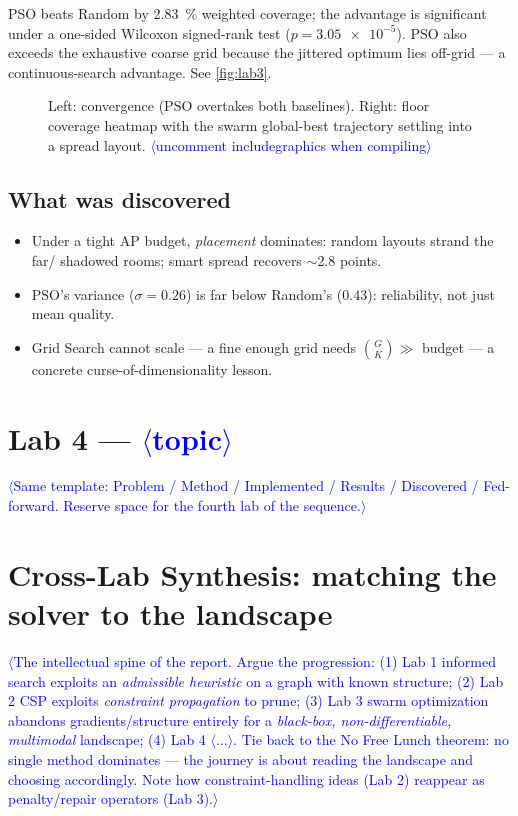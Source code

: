 \documentclass[11pt]{article}
\newcommand{\PH}[1]{\textcolor{blue}{$\langle$#1$\rangle$}}   %
\begin{document}
PSO beats Random by \SI{2.83}{\percent} weighted coverage; the advantage is
significant under a one-sided Wilcoxon signed-rank test ($p=\num{3.05e-5}$). PSO
also exceeds the exhaustive coarse grid because the jittered optimum lies
off-grid — a continuous-search advantage. See \autoref{fig:lab3}.

\begin{figure}[h]\centering
\caption{Left: convergence (PSO overtakes both baselines). Right: floor coverage
heatmap with the swarm global-best trajectory settling into a spread layout.
\PH{uncomment includegraphics when compiling}}
\label{fig:lab3}
\end{figure}

\subsection{What was discovered}
\begin{itemize}
  \item Under a tight AP budget, \emph{placement} dominates: random layouts
        strand the far/ shadowed rooms; smart spread recovers $\sim$2.8 points.
  \item PSO's variance ($\sigma=0.26$) is far below Random's ($0.43$):
        reliability, not just mean quality.
  \item Grid Search cannot scale — a fine enough grid needs
        $\binom{G}{K}\!\gg\!$ budget — a concrete curse-of-dimensionality lesson.
\end{itemize}

\section{Lab 4 --- \PH{topic}}
\label{sec:lab4}
\PH{Same template: Problem / Method / Implemented / Results / Discovered /
Fed-forward. Reserve space for the fourth lab of the sequence.}

\section{Cross-Lab Synthesis: matching the solver to the landscape}
\label{sec:synthesis}
\PH{The intellectual spine of the report. Argue the progression:
(1) Lab 1 informed search exploits an \emph{admissible heuristic} on a graph with
known structure; (2) Lab 2 CSP exploits \emph{constraint propagation} to prune;
(3) Lab 3 swarm optimization abandons gradients/structure entirely for a
\emph{black-box, non-differentiable, multimodal} landscape; (4) Lab 4 \PH{...}.
Tie back to the No Free Lunch theorem: no single method dominates — the journey
is about reading the landscape and choosing accordingly. Note how
constraint-handling ideas (Lab 2) reappear as penalty/repair operators (Lab 3).}
\end{document}
